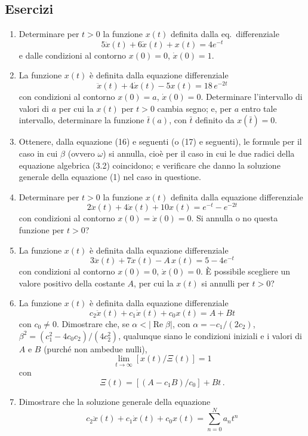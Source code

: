 \documentclass[11pt, a4paper]{book}
\numberwithin{equation}{section}
\newenvironment{esercizi}{\subsection*{Esercizi}\begin{enumerate}}{\end{enumerate}}
\begin{document}
\begin{esercizi}
    \item Determinare per $t > 0$ la funzione $x(t)$ definita dalla eq.~differenziale
    \[
        5\ddot{x}(t) + 6\dot{x}(t) + x(t) = 4 e^{-t}
    \]
    e dalle condizioni al contorno $x(0) = 0$, $\dot{x}(0) = 1$.
    \item La funzione $x(t)$ è definita dalla equazione differenziale
    \[
        \ddot{x}(t) + 4\dot{x}(t) - 5x(t) = 18 \, e^{-2t}
    \]
    con condizioni al contorno $x(0) = a$, $\dot{x}(0) = 0$.
    Determinare l'intervallo di valori di $a$ per cui la $x(t)$ per $t > 0$
    cambia segno; e, per $a$ entro tale intervallo, determinare la funzione
    $\bar{t}(a)$, con $\bar{t}$ definito da $x(\bar{t}) = 0$.
    \item Ottenere, dalla equazione (16) e seguenti (o (17) e seguenti), le
    formule per il caso in cui $\beta$ (ovvero $\omega$) si annulla, cioè per il caso
    in cui le due radici della equazione algebrica (3.2) coincidono; e
    verificare che danno la soluzione generale della equazione (1) nel caso
    in questione.
    \item Determinare per $t > 0$ la funzione $x(t)$ definita dalla equazione
    differenziale
    \[
        2\ddot{x}(t) + 4\dot{x}(t) + 10 x(t) = e^{-t} - e^{-2t}
    \]
    con condizioni al contorno $x(0) = \dot{x}(0) = 0$.
    Si annulla o no questa funzione per $t > 0$?
    \item La funzione $x(t)$ è definita dalla equazione differenziale
    \[
        3\ddot{x}(t) + 7\dot{x}(t) - A \, x(t) = 5 - 4 e^{-t}
    \]
    con condizioni al contorno $x(0) = 0$, $\dot{x}(0) = 0$.
    È possibile scegliere un valore positivo della costante $A$, per cui la
    $x(t)$ si annulli per $t > 0$?
    \item La funzione $x(t)$ è definita dalla equazione differenziale
    \[
        c_2 \ddot{x}(t) + c_1 \dot{x}(t) + c_0 x(t) = A + Bt
    \]
    con $c_0 \neq 0$. Dimostrare che, se $\alpha < |\operatorname{Re}\beta|$, con
    $\alpha = -c_1/(2c_2)$, $\beta^2 = (c_1^2 - 4c_0 c_2)/(4c_2^2)$, qualunque
    siano le condizioni iniziali e i valori di $A$ e $B$ (purché non ambedue
    nulli),
    \[
        \lim_{t \to \infty} \left[ x(t) / \Xi(t) \right] = 1
    \]
    con
    \[
        \Xi(t) = \left[ (A - c_1 B) / c_0 \right] + B t \,.
    \]
    \item[*] Dimostrare che la soluzione generale della equazione
    \[
        c_2 \ddot{x}(t) + c_1 \dot{x}(t) + c_0 x(t) = \sum_{n=0}^{N} a_n t^n
    \]

\end{esercizi}
\end{document}
